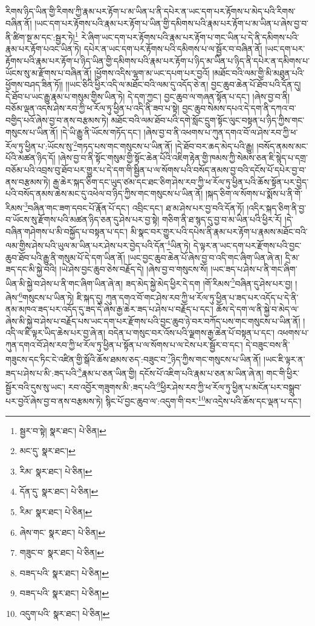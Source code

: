 རིགས་ཉིད་ཡིན་གྱི་རིགས་ཀྱི་རྣམ་པར་རྟོག་པ་མ་ཡིན་པ་ནི་དཔེར་ན་ཡང་དག་པར་རྟོགས་པ་མེད་པའི་རིགས་བཞིན་ནོ། །ཡང་དག་པར་རྟོགས་པའི་རྣམ་པར་རྟོག་པ་ཡིན་གྱི་དམིགས་པའི་རྣམ་པར་རྟོག་པ་མ་ཡིན་པ་ཞེས་བྱ་བ་ནི་ཚིག་སྔ་མ་དང་:སྦྱར་ཏེ།\footnote{སྦྱར་བ་སྟེ།  སྣར་ཐང་།  པེ་ཅིན། } རེ་ཞིག་ཡང་དག་པར་རྟོགས་པའི་རྣམ་པར་རྟོག་པ་གང་ཡིན་པ་དེ་ནི་དམིགས་པའི་རྣམ་པར་རྟོག་པའང་ཡིན་ཏེ། དཔེར་ན་ཡང་དག་པར་རྟོགས་པའི་དམིགས་པ་ལ་སྦྱོར་བ་བཞིན་ནོ། །ཡང་དག་པར་རྟོགས་པའི་རྣམ་པར་རྟོག་པ་ཉིད་ཡིན་གྱི་དམིགས་པའི་རྣམ་པར་རྟོག་པ་ཉིད་མ་ཡིན་པ་ཉིད་ནི་དཔེར་ན་དམིགས་པ་ཡོངས་སུ་མ་རྫོགས་པ་བཞིན་ནོ། །ཕྱོགས་འདིས་ལྷག་མ་ཡང་དཔག་པར་བྱའོ། །མཐོང་བའི་ལམ་གྱི་མི་མཐུན་པའི་ཕྱོགས་བཤད་ཟིན་ཏོ།། །།ཡང་ཅིའི་ཕྱིར་འདི་ལ་མཐོང་བའི་ལམ་དུ་འདོད་ཅེ་ན། བྱང་ཆུབ་ཆེན་པོ་ཐོབ་པའི་དོན་དུ། དེ་ཐོབ་པ་ཡང་རྒྱུ་རྣམ་པ་གསུམ་གྱིས་ཡིན་ཏེ། དེ་དག་ཀྱང་། བྱང་ཆུབ་ལ་གཞན་སྟོན་པ་དང་། །ཞེས་བྱ་བ་ནི། བཅོམ་ལྡན་འདས་ཤེས་རབ་ཀྱི་ཕ་རོལ་ཏུ་ཕྱིན་པ་འདི་ནི་ཟབ་པ་སྟེ། བྱང་ཆུབ་སེམས་དཔའ་དེ་དག་ནི་དཀའ་བ་བགྱིད་པའོ་ཞེས་བྱ་བ་ནས་བརྩམས་ཏེ། མཐོང་བའི་ལམ་ཐོབ་པའི་དགེ་སློང་དྲུག་སྟོང་ལུང་བསྟན་པ་ཉིད་ཀྱིས་གང་གསུངས་པ་ཡིན་ནོ། །དེ་ཡི་རྒྱུ་ནི་ཡོངས་གཏོད་དང་། །ཞེས་བྱ་བ་ནི་འཕགས་པ་ཀུན་དགའ་བོ་ལ་ཤེས་རབ་ཀྱི་ཕ་རོལ་ཏུ་ཕྱིན་པ་:ཡོངས་སུ་\footnote{མང་དུ་  སྣར་ཐང་། }གཏད་པས་གང་གསུངས་པ་ཡིན་ནོ། །དེ་ཐོབ་བར་ཆད་མེད་པའི་རྒྱུ། །བསོད་ནམས་མང་པོའི་མཚན་ཉིད་དོ། །ཞེས་བྱ་བ་ནི་སྟོང་གསུམ་གྱི་སྟོང་ཆེན་པོའི་འཇིག་རྟེན་གྱི་ཁམས་ཀྱི་སེམས་ཅན་ཇི་སྙེད་པ་དགྲ་བཅོམ་པའི་འབྲས་བུ་ཐོབ་པར་གྱུར་པ་དེ་དག་གི་སྦྱིན་པ་ལ་སོགས་པའི་བསོད་ནམས་བྱ་བའི་དངོས་པོ་དཔེར་བྱ་བ་ནས་བརྩམས་ཏེ། རྒྱ་ཆེར་སྐད་ཅིག་དང་ཡུད་ཙམ་དང་ཐང་ཅིག་ཤེས་རབ་ཀྱི་ཕ་རོལ་ཏུ་ཕྱིན་པའི་ཆོས་སྟོན་པར་བྱེད་པའི་བསོད་ནམས་ཆེས་མང་དུ་འཕེལ་བ་ཉིད་ཀྱིས་གང་གསུངས་པ་ཡིན་ནོ། །སྐད་ཅིག་ལ་སོགས་པ་སྨོས་པ་ནི་གོ་རིམས་\footnote{རིམ་  སྣར་ཐང་།  པེ་ཅིན། }བཞིན་གང་ཟག་དབང་པོ་རྣོན་པོ་དང་། འབྲིང་དང་། ཐ་མ་ཤེས་པར་བྱ་བའི་དོན་ཏོ། །འདིར་སྐད་ཅིག་ནི་བྱ་བ་ཡོངས་སུ་རྫོགས་པའི་མཚན་ཉིད་ཅན་དུ་ཤེས་པར་བྱ་སྟེ། གཅིག་ནི་ཐ་སྙད་དུ་བྱ་བ་མ་ཡིན་པའི་ཕྱིར་རོ། །དེ་བཞིན་གཤེགས་པ་མི་བསྐྱོད་པ་བསྟན་པ་དང་། མི་སྣང་བར་གྱུར་པའི་དཔེས་ནི་རྣམ་པར་རྟོག་པ་རྣམས་མཐོང་བའི་ལམ་གྱིས་ཤེས་པའི་ཡུལ་མ་ཡིན་པར་ཤེས་པར་བྱེད་པའི་དོན་\footnote{དོན་དུ་  སྣར་ཐང་།  པེ་ཅིན། }ཡིན་ཏེ། དེ་ལྟར་ན་ཡང་དག་པར་རྫོགས་པའི་བྱང་ཆུབ་ཐོབ་པའི་རྒྱུ་ནི་གསུམ་པོ་དེ་དག་ཡིན་ནོ། །ཡང་བྱང་ཆུབ་ཆེན་པོ་ཞེས་བྱ་བ་འདི་གང་ཞིག་ཡིན་ཞེ་ན། དྲི་མ་ཟད་དང་མི་སྐྱེ་བའི། །ཡེ་ཤེས་བྱང་ཆུབ་ཅེས་བརྗོད་དེ། །ཞེས་བྱ་བ་གསུངས་སོ། །ཡང་ཟད་པ་ཤེས་པ་ནི་གང་ཞིག་ཡིན་མི་སྐྱེ་བ་ཤེས་པ་ནི་གང་ཞིག་ཡིན་ཞེ་ན། ཟད་མེད་སྐྱེ་མེད་ཕྱིར་དེ་དག །གོ་རིམས་\footnote{རིམ་  སྣར་ཐང་།  པེ་ཅིན། }བཞིན་དུ་ཤེས་པར་བྱ། །ཞེས་\footnote{ཞེས་གང་  སྣར་ཐང་།  པེ་ཅིན། }གསུངས་པ་ཡིན་ཏེ། ཇི་སྐད་དུ། ཀུན་དགའ་བོ་གང་ཤེས་རབ་ཀྱི་ཕ་རོལ་ཏུ་ཕྱིན་པ་ཟད་པར་འདོད་པ་དེ་ནི་ནམ་མཁའ་ཟད་པར་འདོད་དུ་ཟད་དེ་ཞེས་རྒྱ་ཆེར་ཟད་པ་ཤེས་པ་བརྗོད་པ་དང་། ཆོས་དེ་དག་ལ་ནི་སྐྱེ་བ་མེད་ལ་ཞེས་མི་སྐྱེ་བ་ཤེས་པ་བརྗོད་པས་ཡང་དག་པར་རྫོགས་པའི་བྱང་ཆུབ་ཉེ་བར་བཀོད་པས་གང་གསུངས་པ་ཡིན་ནོ། །འདི་ལ་ཇི་ལྟར་ཡིད་ཆེས་པར་བྱ་ཞེ་ན། བདེན་པ་གསུང་བར་འོས་པའི་ལྗགས་རྒྱ་ཆེན་པོ་བསྟན་པ་དང་། འཕགས་པ་ཀུན་དགའ་བོ་ཤེས་རབ་ཀྱི་ཕ་རོལ་ཏུ་ཕྱིན་པ་སྟོན་པ་ལ་སོགས་པ་ལ་ངེས་པར་སྦྱོར་བ་དང་། དེ་བཟུང་བས་ནི་གཟུངས་དང་ཏིང་ངེ་འཛིན་གྱི་སྒོའི་ཆོས་ཐམས་ཅད་:བཟུང་བ་\footnote{གཟུང་བ་  སྣར་ཐང་།  པེ་ཅིན། }ཉིད་ཀྱིས་གང་གསུངས་པ་ཡིན་ནོ། །ཡང་ཇི་ལྟར་ན་ཟད་པ་ཤེས་པ་མི་:ཟད་པའི་\footnote{བཟད་པའི་  སྣར་ཐང་།  པེ་ཅིན། }རྣམ་པ་ཅན་ཡིན་གྱི། དངོས་པོ་འཇིག་པའི་རྣམ་པ་ཅན་མ་ཡིན་ཞེ་ན། གང་གི་ཕྱིར་སྦྱོར་བའི་དུས་སུ་ཡང་། རབ་འབྱོར་གཟུགས་མི་:ཟད་པའི་\footnote{བཟད་པའི་  སྣར་ཐང་།  པེ་ཅིན། }ཕྱིར་ཤེས་རབ་ཀྱི་ཕ་རོལ་ཏུ་ཕྱིན་པ་མངོན་པར་བསྒྲུབ་པར་བྱའོ་ཞེས་བྱ་བ་ནས་བརྩམས་ཏེ། སྙིང་པོ་བྱང་ཆུབ་ལ་:འདུག་གི་བར་\footnote{འདུག་པའི་  སྣར་ཐང་།  པེ་ཅིན། }མ་འདྲེས་པའི་ཆོས་དང་ལྡན་པ་དང་། 